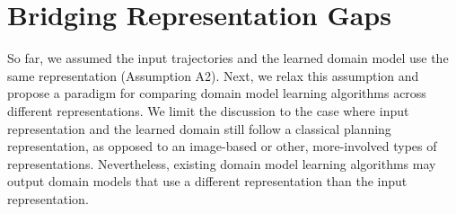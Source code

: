 
\section{Bridging Representation Gaps}
\label{sec:bridging-gap}
So far, we assumed the input trajectories and the learned domain model use the same representation (Assumption A2). Next, we relax this assumption and propose a paradigm for comparing domain model learning algorithms across different representations. 
We limit the discussion to the case where input representation and the learned domain still follow a classical planning representation, as opposed to an image-based or other, more-involved types of representations. 
Nevertheless, existing domain model learning algorithms may output domain models that use a different representation than the input representation.

